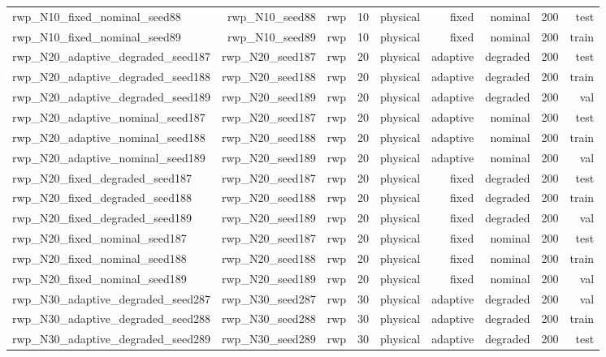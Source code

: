 \begin{tabular}{lrrrrrrrr}
rwp\_N10\_fixed\_nominal\_seed88 & rwp\_N10\_seed88 & rwp & 10 & physical & fixed & nominal & 200 & test \\
rwp\_N10\_fixed\_nominal\_seed89 & rwp\_N10\_seed89 & rwp & 10 & physical & fixed & nominal & 200 & train \\
rwp\_N20\_adaptive\_degraded\_seed187 & rwp\_N20\_seed187 & rwp & 20 & physical & adaptive & degraded & 200 & test \\
rwp\_N20\_adaptive\_degraded\_seed188 & rwp\_N20\_seed188 & rwp & 20 & physical & adaptive & degraded & 200 & train \\
rwp\_N20\_adaptive\_degraded\_seed189 & rwp\_N20\_seed189 & rwp & 20 & physical & adaptive & degraded & 200 & val \\
rwp\_N20\_adaptive\_nominal\_seed187 & rwp\_N20\_seed187 & rwp & 20 & physical & adaptive & nominal & 200 & test \\
rwp\_N20\_adaptive\_nominal\_seed188 & rwp\_N20\_seed188 & rwp & 20 & physical & adaptive & nominal & 200 & train \\
rwp\_N20\_adaptive\_nominal\_seed189 & rwp\_N20\_seed189 & rwp & 20 & physical & adaptive & nominal & 200 & val \\
rwp\_N20\_fixed\_degraded\_seed187 & rwp\_N20\_seed187 & rwp & 20 & physical & fixed & degraded & 200 & test \\
rwp\_N20\_fixed\_degraded\_seed188 & rwp\_N20\_seed188 & rwp & 20 & physical & fixed & degraded & 200 & train \\
rwp\_N20\_fixed\_degraded\_seed189 & rwp\_N20\_seed189 & rwp & 20 & physical & fixed & degraded & 200 & val \\
rwp\_N20\_fixed\_nominal\_seed187 & rwp\_N20\_seed187 & rwp & 20 & physical & fixed & nominal & 200 & test \\
rwp\_N20\_fixed\_nominal\_seed188 & rwp\_N20\_seed188 & rwp & 20 & physical & fixed & nominal & 200 & train \\
rwp\_N20\_fixed\_nominal\_seed189 & rwp\_N20\_seed189 & rwp & 20 & physical & fixed & nominal & 200 & val \\
rwp\_N30\_adaptive\_degraded\_seed287 & rwp\_N30\_seed287 & rwp & 30 & physical & adaptive & degraded & 200 & val \\
rwp\_N30\_adaptive\_degraded\_seed288 & rwp\_N30\_seed288 & rwp & 30 & physical & adaptive & degraded & 200 & train \\
rwp\_N30\_adaptive\_degraded\_seed289 & rwp\_N30\_seed289 & rwp & 30 & physical & adaptive & degraded & 200 & test \\

\end{tabular}
